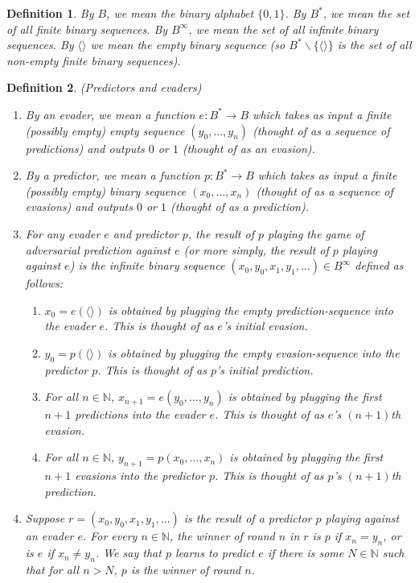 \documentclass{article}
\newtheorem{definition}{Definition}
\begin{document}
\begin{definition}
By $B$, we mean the binary alphabet $\{0,1\}$. By $B^*$, we mean the set of all
finite binary sequences. By $B^\infty$, we mean the set of all infinite binary
sequences. By $\langle\rangle$ we mean the empty binary sequence (so
$B^*\backslash\{\langle\rangle\}$ is the set of all non-empty finite binary
sequences).
\end{definition}

\begin{definition}
    (Predictors and evaders)
    \begin{enumerate}
        \item
        By an \emph{evader}, we mean a function $e:B^*\to B$
        which takes as input a finite (possibly empty) empty sequence $(y_0,\ldots,y_n)$
        (thought of as a sequence of \emph{predictions})
        and outputs $0$ or $1$ (thought of as an \emph{evasion}).
        \item
        By a \emph{predictor}, we mean a function $p:B^*\to B$
        which takes as input a finite (possibly empty) binary sequence $(x_0,\ldots,x_n)$
        (thought of as a sequence of \emph{evasions})
        and outputs $0$ or $1$ (thought of as a \emph{prediction}).
        \item
        For any evader $e$ and predictor $p$, the \emph{result of $p$ playing the
        game of adversarial prediction against $e$} (or more simply, the \emph{result of
        $p$ playing against $e$}) is the infinite binary sequence
        $(x_0,y_0,x_1,y_1,\ldots)\in B^\infty$
        defined as follows:
        \begin{enumerate}
            \item
            $x_0=e(\langle\rangle)$ is obtained by plugging the empty prediction-sequence into
            the evader $e$. This is thought of as $e$'s initial evasion.
            \item
            $y_0=p(\langle\rangle)$ is obtained by plugging the empty evasion-sequence into
            the predictor $p$. This is thought of as $p$'s initial prediction.
            \item
            For all $n\in\mathbb N$,
            $x_{n+1}=e(y_0,\ldots,y_n)$ is obtained by plugging the first $n+1$ predictions
            into the evader $e$. This is thought of as $e$'s $(n+1)$th evasion.
            \item
            For all $n\in\mathbb N$,
            $y_{n+1}=p(x_0,\ldots,x_n)$ is obtained by plugging the first $n+1$ evasions into
            the predictor $p$. This is thought of as $p$'s $(n+1)$th prediction.
        \end{enumerate}
        \item
        Suppose $r=(x_0,y_0,x_1,y_1,\ldots)$ is the result of a predictor $p$ playing
        against an evader $e$. For every $n\in\mathbb N$, the \emph{winner of round $n$}
        in $r$ is $p$ if $x_n=y_n$, or is $e$ if $x_n\neq y_n$.
        We say that \emph{$p$ learns to predict $e$} if there is some $N\in\mathbb N$
        such that for all $n>N$, $p$ is the winner of round $n$.
    \end{enumerate}
\end{definition}



\end{document}

